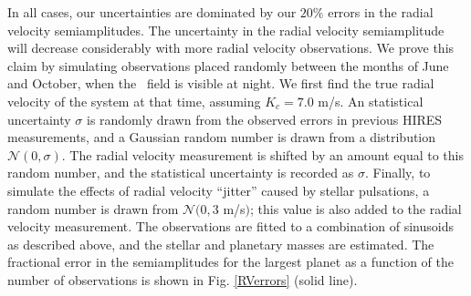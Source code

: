In all cases, our uncertainties are dominated by our $20 \%$ errors in the radial velocity semiamplitudes. The uncertainty in the radial velocity semiamplitude will decrease considerably with more radial velocity observations. We prove this claim by simulating observations placed randomly between the months of June and October, when the \kep\ field is visible at night. We first find the true radial velocity of the system at that time, assuming $K_c = 7.0$ m/s. An statistical uncertainty $\sigma$ is randomly drawn from the observed errors in previous HIRES measurements, and a Gaussian random number is drawn from a distribution $\mathcal{N}(0,\sigma)$. The radial velocity measurement is shifted by an amount equal to this random number, and the statistical uncertainty is recorded as $\sigma$. Finally, to simulate the effects of radial velocity ``jitter'' caused by stellar pulsations, a random number is drawn from $\mathcal{N}(0,3 $ m/s$)$; this value is also added to the radial velocity measurement. The observations are fitted to a combination of sinusoids as described above, and the stellar and planetary masses are estimated. The fractional error in the semiamplitudes for the largest planet as a function of the number of observations is shown in Fig. \ref{RVerrors} (solid line).

